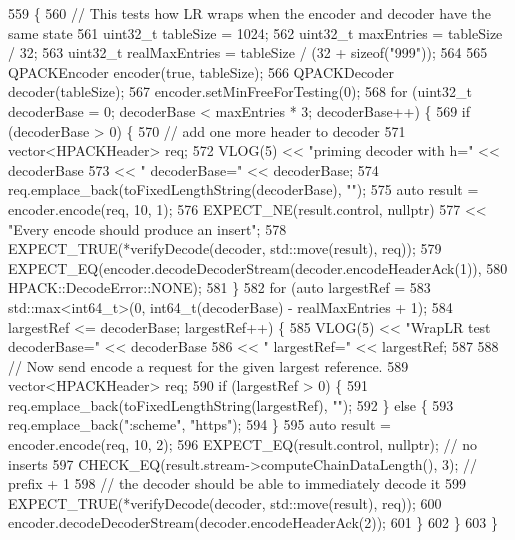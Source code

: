 \begin{DoxyCode}
559                                       \{
560   \textcolor{comment}{// This tests how LR wraps when the encoder and decoder have the same state}
561   uint32\_t tableSize = 1024;
562   uint32\_t maxEntries = tableSize / 32;
563   uint32\_t realMaxEntries = tableSize / (32 + \textcolor{keyword}{sizeof}(\textcolor{stringliteral}{"999"}));
564 
565   QPACKEncoder encoder(\textcolor{keyword}{true}, tableSize);
566   QPACKDecoder decoder(tableSize);
567   encoder.setMinFreeForTesting(0);
568   \textcolor{keywordflow}{for} (uint32\_t decoderBase = 0; decoderBase < maxEntries * 3; decoderBase++) \{
569     \textcolor{keywordflow}{if} (decoderBase > 0) \{
570       \textcolor{comment}{// add one more header to decoder}
571       vector<HPACKHeader> req;
572       VLOG(5) << \textcolor{stringliteral}{"priming decoder with h="} << decoderBase
573               << \textcolor{stringliteral}{" decoderBase="} << decoderBase;
574       req.emplace\_back(toFixedLengthString(decoderBase), \textcolor{stringliteral}{""});
575       \textcolor{keyword}{auto} result = encoder.encode(req, 10, 1);
576       EXPECT\_NE(result.control, \textcolor{keyword}{nullptr})
577         << \textcolor{stringliteral}{"Every encode should produce an insert"};
578       EXPECT\_TRUE(*verifyDecode(decoder, std::move(result), req));
579       EXPECT\_EQ(encoder.decodeDecoderStream(decoder.encodeHeaderAck(1)),
580                 HPACK::DecodeError::NONE);
581     \}
582     \textcolor{keywordflow}{for} (\textcolor{keyword}{auto} largestRef =
583            std::max<int64\_t>(0, int64\_t(decoderBase) - realMaxEntries + 1);
584          largestRef <= decoderBase; largestRef++) \{
585       VLOG(5) << \textcolor{stringliteral}{"WrapLR test decoderBase="} << decoderBase
586               << \textcolor{stringliteral}{" largestRef="} << largestRef;
587 
588       \textcolor{comment}{// Now send encode a request for the given largest reference.}
589       vector<HPACKHeader> req;
590       \textcolor{keywordflow}{if} (largestRef > 0) \{
591         req.emplace\_back(toFixedLengthString(largestRef), \textcolor{stringliteral}{""});
592       \} \textcolor{keywordflow}{else} \{
593         req.emplace\_back(\textcolor{stringliteral}{":scheme"}, \textcolor{stringliteral}{"https"});
594       \}
595       \textcolor{keyword}{auto} result = encoder.encode(req, 10, 2);
596       EXPECT\_EQ(result.control, \textcolor{keyword}{nullptr}); \textcolor{comment}{// no inserts}
597       CHECK\_EQ(result.stream->computeChainDataLength(), 3); \textcolor{comment}{// prefix + 1}
598       \textcolor{comment}{// the decoder should be able to immediately decode it}
599       EXPECT\_TRUE(*verifyDecode(decoder, std::move(result), req));
600       encoder.decodeDecoderStream(decoder.encodeHeaderAck(2));
601     \}
602   \}
603 \}
\end{DoxyCode}
